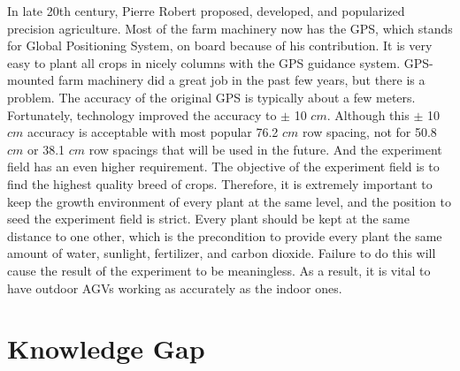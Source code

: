 In late 20th century, Pierre Robert proposed, developed, and popularized precision agriculture. \cite{mcbratney2005future} Most of the farm machinery now has the GPS, which stands for Global Positioning System, on board because of his contribution. It is very easy to plant all crops in nicely columns with the GPS guidance system. GPS-mounted farm machinery did a great job in the past few years, but there is a problem. The accuracy of the original GPS is typically about a few meters. Fortunately, technology improved the accuracy to $\pm$ 10 $cm$. \cite{thuilot2002automatic} Although this $\pm$ 10 $cm$ accuracy is acceptable with most popular 76.2 $cm$ row spacing, not for 50.8 $cm$ or 38.1 $cm$ row spacings that will be used in the future. \cite{fawcett2014farm} And the experiment field has an even higher requirement. The objective of the experiment field is to find the highest quality breed of crops. Therefore, it is extremely important to keep the growth environment of every plant at the same level, and the position to seed the experiment field is strict. Every plant should be kept at the same distance to one other, which is the precondition to provide every plant the same amount of water, sunlight, fertilizer, and carbon dioxide. Failure to do this will cause the result of the experiment to be meaningless. As a result, it is vital to have outdoor AGVs working as accurately as the indoor ones.

\section{Knowledge Gap}

